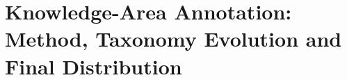 %
%
\providecommand{\KnowledgeAreaFigDir}{figures}

\section{Knowledge-Area Annotation: Method, Taxonomy Evolution and Final Distribution}
\label{app:ka}

